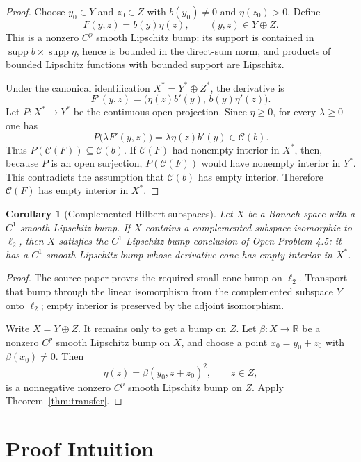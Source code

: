 \documentclass[11pt]{article}
\newtheorem{corollary}{Corollary}
\newcommand{\C}{\mathcal C}
\begin{document}
\begin{proof}
Choose \(y_0\in Y\) and \(z_0\in Z\) with \(b(y_0)\neq0\) and
\(\eta(z_0)>0\).  Define
\[
  F(y,z)=b(y)\eta(z),\qquad (y,z)\in Y\oplus Z.
\]
This is a nonzero \(C^p\) smooth Lipschitz bump: its support is contained in
\(\operatorname{supp} b\times \operatorname{supp}\eta\), hence is bounded in
the direct-sum norm, and products of bounded Lipschitz functions with bounded
support are Lipschitz.

Under the canonical identification \(X^*=Y^*\oplus Z^*\), the derivative is
\[
  F'(y,z)=\bigl(\eta(z)b'(y),\, b(y)\eta'(z)\bigr).
\]
Let \(P:X^*\to Y^*\) be the continuous open projection.  Since \(\eta\geq0\),
for every \(\lambda\geq0\) one has
\[
  P\bigl(\lambda F'(y,z)\bigr)
  =\lambda\eta(z)b'(y)\in \C(b).
\]
Thus \(P(\C(F))\subseteq \C(b)\).  If \(\C(F)\) had nonempty interior in
\(X^*\), then, because \(P\) is an open surjection, \(P(\C(F))\) would have
nonempty interior in \(Y^*\).  This contradicts the assumption that \(\C(b)\)
has empty interior.  Therefore \(\C(F)\) has empty interior in \(X^*\).
\end{proof}

\begin{corollary}[Complemented Hilbert subspaces]
\label{cor:l2}
Let \(X\) be a Banach space with a \(C^1\) smooth Lipschitz bump.  If \(X\)
contains a complemented subspace isomorphic to \(\ell_2\), then \(X\) satisfies
the \(C^1\) Lipschitz-bump conclusion of Open Problem 4.5: it has a \(C^1\)
smooth Lipschitz bump whose derivative cone has empty interior in \(X^*\).
\end{corollary}

\begin{proof}
The source paper proves the required small-cone bump on \(\ell_2\).  Transport
that bump through the linear isomorphism from the complemented subspace \(Y\)
onto \(\ell_2\); empty interior is preserved by the adjoint isomorphism.

Write \(X=Y\oplus Z\).  It remains only to get a bump on \(Z\).  Let
\(\beta:X\to\mathbb R\) be a nonzero \(C^p\) smooth Lipschitz bump on \(X\),
and choose a point \(x_0=y_0+z_0\) with \(\beta(x_0)\neq0\).  Then
\[
  \eta(z)=\beta(y_0,z+z_0)^2,\qquad z\in Z,
\]
is a nonnegative nonzero \(C^p\) smooth Lipschitz bump on \(Z\).  Apply
Theorem~\ref{thm:transfer}.
\end{proof}

\section*{Proof Intuition}
\end{document}
